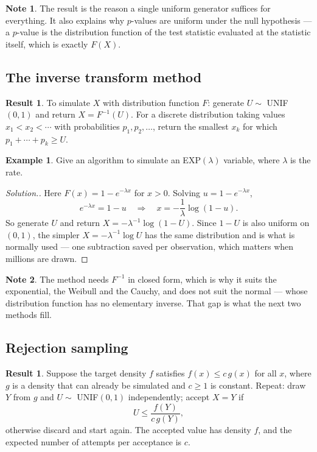 \documentclass[11pt,a4paper]{article}
\theoremstyle{definition}
\newtheorem{exa}[thm]{Example}
\newtheorem{result}[thm]{Result}
\newtheorem*{note}{Note}
\newenvironment{solution}
  {\renewcommand{\qedsymbol}{}\begin{proof}[\textit{Solution}.]}
  {\end{proof}}
\begin{document}
\begin{note}
The result is the reason a single uniform generator suffices for everything. It
also explains why $p$-values are uniform under the null hypothesis --- a
$p$-value is the distribution function of the test statistic evaluated at the
statistic itself, which is exactly $F(X)$.
\end{note}

\subsection{The inverse transform method}

\begin{result}
To simulate $X$ with distribution function $F$: generate $U\sim$ UNIF$(0,1)$ and
return $X = F^{-1}(U)$. For a discrete distribution taking values
$x_1<x_2<\cdots$ with probabilities $p_1,p_2,\dots$, return the smallest $x_k$
for which $p_1+\cdots+p_k \geq U$.
\end{result}

\begin{exa}
Give an algorithm to simulate an EXP$(\lambda)$ variable, where $\lambda$ is the
rate.
\end{exa}

\begin{solution}
Here $F(x) = 1-e^{-\lambda x}$ for $x>0$. Solving $u = 1-e^{-\lambda x}$,
$$e^{-\lambda x} = 1-u \quad\Longrightarrow\quad
x = -\frac{1}{\lambda}\log(1-u).$$
So generate $U$ and return $X = -\lambda^{-1}\log(1-U)$. Since $1-U$ is also
uniform on $(0,1)$, the simpler $X=-\lambda^{-1}\log U$ has the same
distribution and is what is normally used --- one subtraction saved per
observation, which matters when millions are drawn.
\end{solution}

\begin{note}
The method needs $F^{-1}$ in closed form, which is why it suits the exponential,
the Weibull and the Cauchy, and does not suit the normal --- whose distribution
function has no elementary inverse. That gap is what the next two methods fill.
\end{note}

\subsection{Rejection sampling}

\begin{result}
Suppose the target density $f$ satisfies $f(x)\leq c\,g(x)$ for all $x$, where
$g$ is a density that can already be simulated and $c\geq1$ is constant.
Repeat: draw $Y$ from $g$ and $U\sim$ UNIF$(0,1)$ independently; accept $X=Y$ if
$$U \leq \frac{f(Y)}{c\,g(Y)},$$
otherwise discard and start again. The accepted value has density $f$, and the
expected number of attempts per acceptance is $c$.
\end{result}
\end{document}
